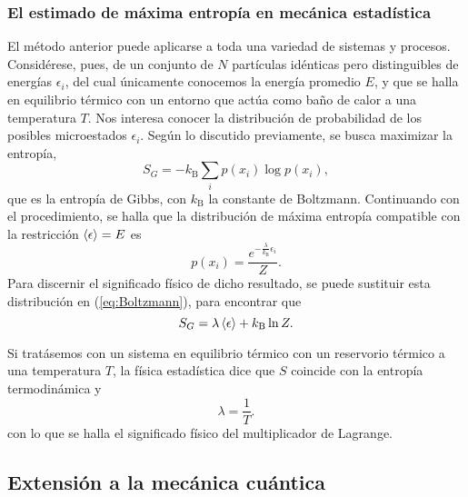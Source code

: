 \subsubsection{El estimado de máxima entropía en mecánica estadística}

El método anterior puede aplicarse a toda una variedad de sistemas y procesos. Considérese, pues, de un conjunto de $N$ partículas idénticas pero distinguibles de energías $\epsilon_{i}$, del cual únicamente conocemos la energía promedio $E$, y que se halla en equilibrio térmico con un entorno que actúa como baño de calor a una temperatura $T$. Nos interesa conocer la distribución de probabilidad de los posibles microestados $\epsilon_{i}$. Según lo discutido previamente, se busca maximizar la entropía,
\begin{equation}\label{eq:GibbsEntropy}
    S_{G}=-k_{\text{B}}\sum_{i}p(x_{i})\log{p(x_{i})},
\end{equation}
que es la entropía de Gibbs, con $k_{\text{B}}$ la constante de Boltzmann. Continuando con el procedimiento, se halla que la distribución de máxima entropía compatible con la restricción $\expval{\epsilon}=E$ es
\begin{equation}\label{eq:Boltzmann}
    p(x_{i})=\frac{e^{-\frac{\lambda}{k_{\text{B}}}\epsilon_{i}}}{Z}.
\end{equation}
Para discernir el significado físico de dicho resultado, se puede sustituir esta distribución en (\ref{eq:Boltzmann}), para encontrar que
\begin{equation}
    S_{G}=\lambda\expval{\epsilon}+k_{\text{B}}\ln{Z}.
\end{equation}

Si tratásemos con un sistema en equilibrio térmico con un reservorio térmico a una temperatura $T$, la física estadística dice que $S$ coincide con la entropía termodinámica y
\begin{equation*}
    \lambda=\frac{1}{T}.
\end{equation*}
con lo que se halla el significado físico del multiplicador de Lagrange. \cite{Greiner}

\subsection{Extensión a la mecánica cuántica}

